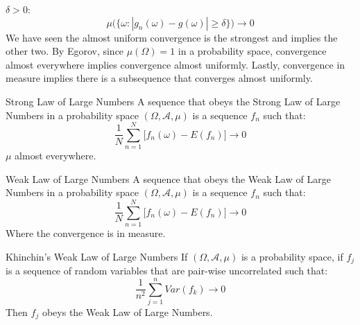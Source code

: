     $\delta>0$:
    \begin{equation}
        \mu\Big(\{\omega:|g_{n}(\omega)-g(\omega)|\geq\delta\}
        \Big)\rightarrow{0}
    \end{equation}
    We have seen the almost uniform convergence is the
    strongest and implies the other two. By Egorov, since
    $\mu(\Omega)=1$ in a probability space,
    convergence almost everywhere implies convergence almost
    uniformly. Lastly, convergence in measure implies there
    is a subsequence that converges almost uniformly.
    \begin{ldefinition}{Strong Law of Large Numbers}
        A sequence that obeys the Strong Law of Large Numbers
        in a probability space $(\Omega,\mathcal{A},\mu)$
        is a sequence $f_{n}$ such that:
        \begin{equation}
            \frac{1}{N}\sum_{n=1}^{N}
                \Big[f_{n}(\omega)-E(f_{n})\Big]\rightarrow{0}
        \end{equation}
        $\mu$ almost everywhere.
    \end{ldefinition}
    \begin{ldefinition}{Weak Law of Large Numbers}
        A sequence that obeys the Weak Law of Large Numbers
        in a probability space $(\Omega,\mathcal{A},\mu)$
        is a sequence $f_{n}$ such that:
        \begin{equation}
            \frac{1}{N}\sum_{n=1}^{N}
                \Big[f_{n}(\omega)-E(f_{n})\Big]\rightarrow{0}
        \end{equation}
        Where the convergence is in measure.
    \end{ldefinition}
    \begin{ltheorem}{Khinchin's Weak Law of Large Numbers}
        If $(\Omega,\mathcal{A},\mu)$ is a probability space,
        if $f_{j}$ is a sequence of random variables that
        are pair-wise uncorrelated such that:
        \begin{equation}
            \frac{1}{n^{2}}\sum_{j=1}^{n}Var(f_{k})
            \rightarrow{0}
        \end{equation}
        Then $f_{j}$ obeys the Weak Law of Large Numbers.
    \end{ltheorem}
